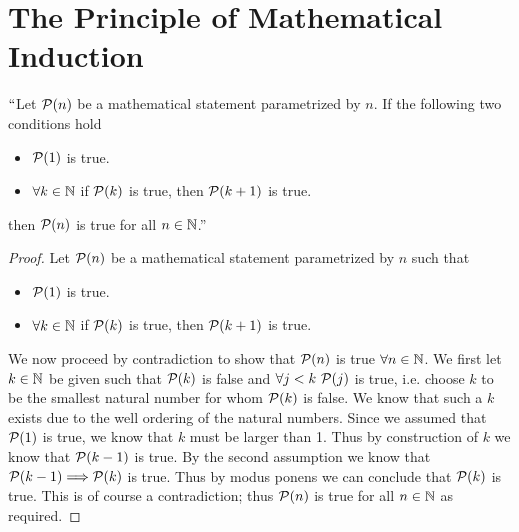     \section{The Principle of Mathematical Induction}
        \begin{theorem}
            $``$Let $\mathcal{P}(n)$ be a mathematical statement parametrized by $n$.
            If the following two conditions hold
            \begin{itemize}
                \item
                    $\mathcal{P}(1)$ is true.
                \item
                    $\forall k \in \mathbb{N}$ if $\mathcal{P}(k)$ is true, then $\mathcal{P}(k + 1)$ is true.
            \end{itemize}
            then $\mathcal{P}(n)$ is true for all $n \in \mathbb{N}$.''
        \end{theorem}
        \begin{proof}
            Let $\mathcal{P}(n)$ be a mathematical statement parametrized by $n$ such that
            \begin{itemize}
                \item
                    $\mathcal{P}(1)$ is true.
                \item
                    $\forall k \in \mathbb{N}$ if $\mathcal{P}(k)$ is true, then $\mathcal{P}(k + 1)$ is true.
            \end{itemize}
            We now proceed by contradiction to show that   
            $\mathcal{P}(n)$ is true $\forall n \in \mathbb{N}$. We first let $k \in \mathbb{N}$ be
            given such that $\mathcal{P}(k)$ is false and $\forall j < k \
            \mathcal{P}(j)$ is true, i.e. choose $k$ to be the smallest natural number for whom
            $\mathcal{P}(k)$ is false. We know that such a $k$ exists due to the well ordering
            of the natural numbers. Since we assumed that $\mathcal{P}(1)$ is true, we know that
            $k$ must be larger than 1. Thus by construction of $k$ we know that $\mathcal{P}(k - 1)$
            is true. By the second assumption we know that $\mathcal{P}(k - 1) \Longrightarrow \mathcal{P}(k)$
            is true. Thus by modus ponens we can conclude that $\mathcal{P}(k)$ is true. 
            This is of course a contradiction; thus $\mathcal{P}(n)$ is true for all $n \in \mathbb{N}$
            as required. \QED
        \end{proof}
